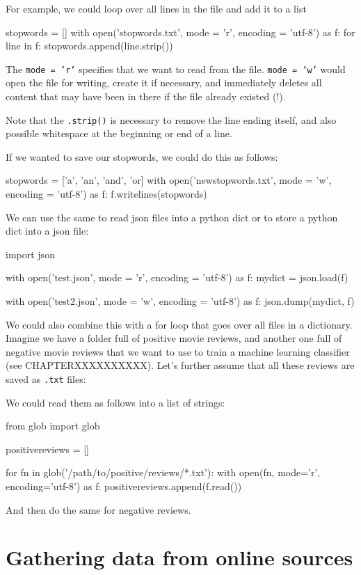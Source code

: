 For example, we could loop over all lines in the file and add it to a list

\begin{examplepy}
stopwords = []
with open('stopwords.txt', mode = 'r', encoding = 'utf-8') as f:
    for line in f:
        stopwords.append(line.strip())
\end{examplepy}

The \texttt{mode = 'r'} specifies that we want to read from the file. \texttt{mode = 'w'} would open the file for writing, create it if necessary, and immediately deletes all content that may have been in there if the file already existed (!).

Note that the \texttt{.strip()} is necessary to remove the line ending itself, and also possible whitespace at the beginning or end of a line.

If we wanted to save our stopwords, we could do this as follows: 
\begin{examplepy}
stopwords = ['a', 'an', 'and', 'or]
with open('newstopwords.txt', mode = 'w', encoding = 'utf-8') as f:
    f.writelines(stopwords)
\end{examplepy}

We can use the same to read json files into a python dict or to store a python dict into a json file:


\begin{examplepy}
import json

with open('test.json', mode = 'r', encoding = 'utf-8') as f:
    mydict = json.load(f)

with open('test2.json', mode = 'w', encoding = 'utf-8') as f:
    json.dump(mydict, f)

\end{examplepy}


We could also combine this with a for loop that goes over all files in a dictionary.
Imagine we have a folder full of positive movie reviews, and another one full of negative movie reviews that we want to use to train a machine learning classifier (see CHAPTERXXXXXXXXXX). Let's further assume that all these reviews are saved as \texttt{.txt} files:

We could read them as follows into a list of strings:

\begin{examplepy}
from glob import glob

positivereviews = []

for fn in glob('/path/to/positive/reviews/*.txt'):
    with open(fn, mode='r', encoding='utf-8') as f:
        positivereviews.append(f.read())
\end{examplepy}

And then do the same for negative reviews.







\section{Gathering data from online sources}
\label{sec:gathering}


